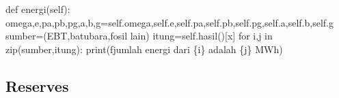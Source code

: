 \documentclass[
  a4paper,
  DIV=11,
  numbers=noendperiod]{scrartcl}
\newenvironment{Shaded}{\begin{snugshade}}{\end{snugshade}}
\newcommand{\BuiltInTok}[1]{\textcolor[rgb]{0.00,0.23,0.31}{#1}}
\newcommand{\ControlFlowTok}[1]{\textcolor[rgb]{0.00,0.23,0.31}{#1}}
\newcommand{\KeywordTok}[1]{\textcolor[rgb]{0.00,0.23,0.31}{#1}}
\newcommand{\NormalTok}[1]{\textcolor[rgb]{0.00,0.23,0.31}{#1}}
\newcommand{\OperatorTok}[1]{\textcolor[rgb]{0.37,0.37,0.37}{#1}}
\newcommand{\SpecialCharTok}[1]{\textcolor[rgb]{0.37,0.37,0.37}{#1}}
\newcommand{\SpecialStringTok}[1]{\textcolor[rgb]{0.13,0.47,0.30}{#1}}
\newcommand{\StringTok}[1]{\textcolor[rgb]{0.13,0.47,0.30}{#1}}
\newcommand{\VariableTok}[1]{\textcolor[rgb]{0.07,0.07,0.07}{#1}}
\begin{document}
\begin{Shaded}
\begin{Highlighting}[]
  \KeywordTok{def}\NormalTok{ energi(}\VariableTok{self}\NormalTok{):}
\NormalTok{    omega,e,pa,pb,pg,a,b,g}\OperatorTok{=}\VariableTok{self}\NormalTok{.omega,}\VariableTok{self}\NormalTok{.e,}\VariableTok{self}\NormalTok{.pa,}\VariableTok{self}\NormalTok{.pb,}\VariableTok{self}\NormalTok{.pg,}\VariableTok{self}\NormalTok{.a,}\VariableTok{self}\NormalTok{.b,}\VariableTok{self}\NormalTok{.g}
\NormalTok{    sumber}\OperatorTok{=}\NormalTok{(}\StringTok{\textquotesingle{}EBT\textquotesingle{}}\NormalTok{,}\StringTok{\textquotesingle{}batubara\textquotesingle{}}\NormalTok{,}\StringTok{\textquotesingle{}fosil lain\textquotesingle{}}\NormalTok{)}
\NormalTok{    itung}\OperatorTok{=}\VariableTok{self}\NormalTok{.hasil()[}\StringTok{\textquotesingle{}x\textquotesingle{}}\NormalTok{]}
    \ControlFlowTok{for}\NormalTok{ i,j }\KeywordTok{in} \BuiltInTok{zip}\NormalTok{(sumber,itung):}
      \BuiltInTok{print}\NormalTok{(}\SpecialStringTok{f\textquotesingle{}jumlah energi dari }\SpecialCharTok{\{}\NormalTok{i}\SpecialCharTok{\}}\SpecialStringTok{ adalah }\SpecialCharTok{\{}\NormalTok{j}\SpecialCharTok{\}}\SpecialStringTok{ MWh\textquotesingle{}}\NormalTok{)}
\end{Highlighting}
\end{Shaded}

\hypertarget{reserves}{%
\subsection{Reserves}\label{reserves}}
\end{document}
